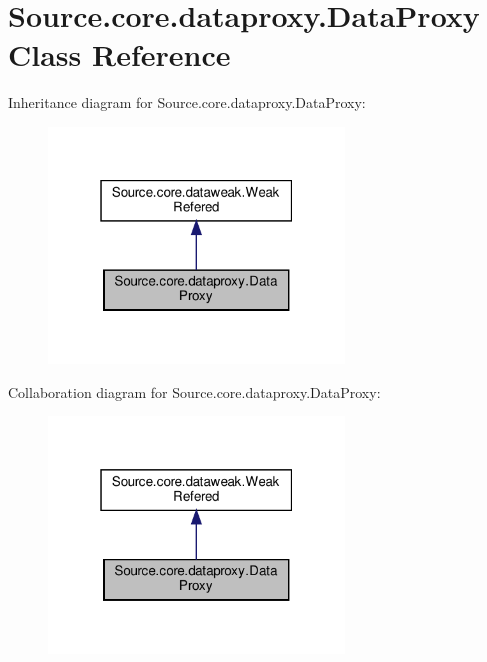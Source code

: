 \hypertarget{classSource_1_1core_1_1dataproxy_1_1DataProxy}{}\section{Source.\+core.\+dataproxy.\+Data\+Proxy Class Reference}
\label{classSource_1_1core_1_1dataproxy_1_1DataProxy}


Inheritance diagram for Source.\+core.\+dataproxy.\+Data\+Proxy\+:\nopagebreak
\begin{figure}[H]
\begin{center}
\leavevmode
\includegraphics[width=223pt]{classSource_1_1core_1_1dataproxy_1_1DataProxy__inherit__graph}
\end{center}
\end{figure}


Collaboration diagram for Source.\+core.\+dataproxy.\+Data\+Proxy\+:\nopagebreak
\begin{figure}[H]
\begin{center}
\leavevmode
\includegraphics[width=223pt]{classSource_1_1core_1_1dataproxy_1_1DataProxy__coll__graph}
\end{center}
\end{figure}
